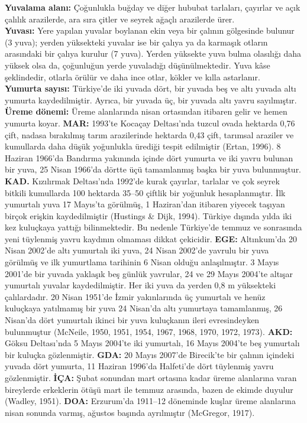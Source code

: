 \documentclass[
  10.5pt,
  a4paper,
  DIV=11,
  numbers=noendperiod,
  twocolumn]{scrreprt}
\begin{document}
\textbf{Yuvalama alanı:} Çoğunlukla buğday ve diğer hububat tarlaları,
çayırlar ve açık çalılık arazilerde, ara sıra çitler ve seyrek ağaçlı
arazilerde ürer.\\
\textbf{Yuvası:} Yere yapılan yuvalar boylanan ekin veya bir çalının
gölgesinde bulunur (3 yuva); yerden yüksekteki yuvalar ise bir çalıya ya
da karmaşık otların arasındaki bir çalıya kurulur (7 yuva). Yerden
yüksekte yuva bulma olasılığı daha yüksek olsa da, çoğunluğun yerde
yuvaladığı düşünülmektedir. Yuva kâse şeklindedir, otlarla örülür ve
daha ince otlar, kökler ve kılla astarlanır.\\
\textbf{Yumurta sayısı:} Türkiye'de iki yuvada dört, bir yuvada beş ve
altı yuvada altı yumurta kaydedilmiştir. Ayrıca, bir yuvada üç, bir
yuvada altı yavru sayılmıştır.\\
\textbf{Üreme dönemi:} Üreme alanlarında nisan ortasından itibaren gelir
ve hemen yumurta koyar. \textbf{MAR:} 1993'te Kocaçay Deltası'nda tuzcul
ovada hektarda 0,76 çift, nadasa bırakılmış tarım arazilerinde hektarda
0,43 çift, tarımsal araziler ve kumullarda daha düşük yoğunlukla ürediği
tespit edilmiştir (Ertan, 1996). 8 Haziran 1966'da Bandırma yakınında
içinde dört yumurta ve iki yavru bulunan bir yuva, 25 Nisan 1966'da
dörtte üçü tamamlanmış başka bir yuva bulunmuştur. \textbf{KAD.}
Kızılırmak Deltası'nda 1992'de kurak çayırlar, tarlalar ve çok seyrek
bitkili kumullarda 100 hektarda 35--50 çiftlik bir yoğunluk
hesaplanmıştır. İlk yumurtalı yuva 17 Mayıs'ta görülmüş, 1 Haziran'dan
itibaren yiyecek taşıyan birçok erişkin kaydedilmiştir (Hustings \&
Dijk, 1994). Türkiye dışında yılda iki kez kuluçkaya yattığı
bilinmektedir. Bu nedenle Türkiye'de temmuz ve sonrasında yeni tüylenmiş
yavru kaydının olmaması dikkat çekicidir. \textbf{EGE:} Altınkum'da 20
Nisan 2002'de altı yumurtalı iki yuva, 24 Nisan 2002'de yavrulu bir yuva
görülmüş ve ilk yumurtlama tarihinin 6 Nisan olduğu anlaşılmıştır. 3
Mayıs 2001'de bir yuvada yaklaşık beş günlük yavrular, 24 ve 29 Mayıs
2004'te altışar yumurtalı yuvalar kaydedilmiştir. Her iki yuva da yerden
0,8 m yüksekteki çalılardadır. 20 Nisan 1951'de İzmir yakınlarında üç
yumurtalı ve henüz kuluçkaya yatılmamış bir yuva 24 Nisan'da altı
yumurtaya tamamlanmış, 26 Nisan'da dört yumurtalı ikinci bir yuva
kuluçkanın ileri evresindeyken bulunmuştur (McNeile, 1950, 1951, 1954,
1967, 1968, 1970, 1972, 1973). \textbf{AKD:} Göksu Deltası'nda 5 Mayıs
2004'te iki yumurtalı, 16 Mayıs 2004'te beş yumurtalı bir kuluçka
gözlenmiştir. \textbf{GDA:} 20 Mayıs 2007'de Birecik'te bir çalının
içindeki yuvada dört yumurta, 11 Haziran 1996'da Halfeti'de dört
tüylenmiş yavru gözlenmiştir. \textbf{İÇA:} Şubat sonundan mart ortasına
kadar üreme alanlarına varan bireylerde erkeklerin ötüşü mart ile temmuz
arasında, bazen de ekimde duyulur (Wadley, 1951). \textbf{DOA:}
Erzurum'da 1911--12 döneminde kuşlar üreme alanlarına nisan sonunda
varmış, ağustos başında ayrılmıştır (McGregor, 1917).
\end{document}
